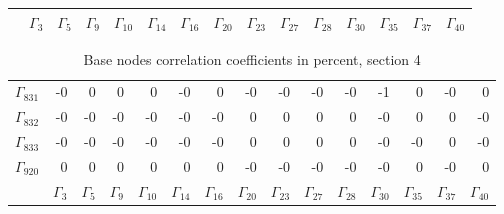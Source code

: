 {\begin{table}
\begin{center}
\begin{minipage}{\linewidth}
\begin{center}
\begin{envsmall}
\begin{center}
\begin{tabular}{rrrrrrrrrrrrrrr}
 & \( \Gamma_{3} \) & \( \Gamma_{5} \) & \( \Gamma_{9} \) & \( \Gamma_{10} \) & \( \Gamma_{14} \) & \( \Gamma_{16} \) & \( \Gamma_{20} \) & \( \Gamma_{23} \) & \( \Gamma_{27} \) & \( \Gamma_{28} \) & \( \Gamma_{30} \) & \( \Gamma_{35} \) & \( \Gamma_{37} \) & \( \Gamma_{40} \)
\\\hline
\end{tabular}
\end{center}
\end{envsmall}
\ifhevea\else
\end{center}
\end{minipage}
\fi
\end{center}
\ifhevea\end{table}\fi
\ifhevea\begin{table}\fi%
\begin{center}
\ifhevea
\caption{Base nodes correlation coefficients in percent, section 4\label{tab:tau:br-fit-corr4}}%
\else
\begin{minipage}{\linewidth}
\begin{center}
\label{tab:tau:br-fit-corr4}%
\fi
\begin{envsmall}
\begin{center}
\renewcommand*{\arraystretch}{1.1}%
\begin{tabular}{rrrrrrrrrrrrrrr}
\hline
\( \Gamma_{831} \) &   -0 &    0 &    0 &    0 &   -0 &    0 &   -0 &   -0 &   -0 &   -0 &   -1 &    0 &   -0 &    0 \\
\( \Gamma_{832} \) &   -0 &   -0 &   -0 &   -0 &   -0 &   -0 &    0 &    0 &    0 &    0 &   -0 &    0 &    0 &   -0 \\
\( \Gamma_{833} \) &   -0 &   -0 &   -0 &   -0 &   -0 &   -0 &    0 &    0 &    0 &    0 &   -0 &   -0 &    0 &   -0 \\
\( \Gamma_{920} \) &    0 &    0 &    0 &    0 &    0 &    0 &   -0 &   -0 &   -0 &   -0 &   -0 &    0 &   -0 &    0 \\
 & \( \Gamma_{3} \) & \( \Gamma_{5} \) & \( \Gamma_{9} \) & \( \Gamma_{10} \) & \( \Gamma_{14} \) & \( \Gamma_{16} \) & \( \Gamma_{20} \) & \( \Gamma_{23} \) & \( \Gamma_{27} \) & \( \Gamma_{28} \) & \( \Gamma_{30} \) & \( \Gamma_{35} \) & \( \Gamma_{37} \) & \( \Gamma_{40} \)
\\\hline
\end{tabular}
\end{center}
\end{envsmall}

\end{center}
\end{minipage}
\end{center}
\end{table}}
